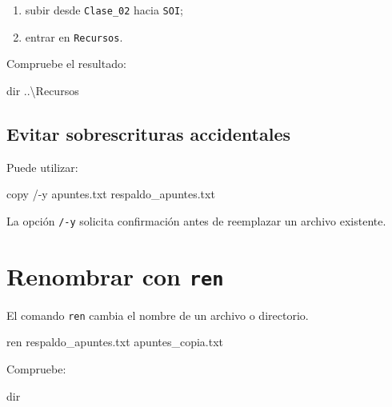 \documentclass[
  spanish,
  letterpaper,
]{scrbook}
\newenvironment{Shaded}{\begin{snugshade}}{\end{snugshade}}
\newcommand{\AttributeTok}[1]{\textcolor[rgb]{0.40,0.45,0.13}{#1}}
\newcommand{\BuiltInTok}[1]{\textcolor[rgb]{0.00,0.23,0.31}{#1}}
\newcommand{\NormalTok}[1]{\textcolor[rgb]{0.00,0.23,0.31}{#1}}
\providecommand{\tightlist}{%
  \setlength{\itemsep}{0pt}\setlength{\parskip}{0pt}}
\begin{document}
\begin{enumerate}
\def\labelenumi{\arabic{enumi}.}
\tightlist
\item
  subir desde \texttt{Clase\_02} hacia \texttt{SOI};
\item
  entrar en \texttt{Recursos}.
\end{enumerate}

Compruebe el resultado:

\begin{Shaded}
\begin{Highlighting}[]
\BuiltInTok{dir}\NormalTok{ ..\textbackslash{}Recursos}
\end{Highlighting}
\end{Shaded}

\section{Evitar sobrescrituras
accidentales}\label{evitar-sobrescrituras-accidentales}

Puede utilizar:

\begin{Shaded}
\begin{Highlighting}[]
\BuiltInTok{copy}\NormalTok{ /}\AttributeTok{{-}y}\NormalTok{ apuntes.txt respaldo\_apuntes.txt}
\end{Highlighting}
\end{Shaded}

La opción \texttt{/-y} solicita confirmación antes de reemplazar un
archivo existente.


\chapter{\texorpdfstring{Renombrar con
\texttt{ren}}{Renombrar con ren}}\label{renombrar-con-ren}

El comando \texttt{ren} cambia el nombre de un archivo o directorio.

\begin{Shaded}
\begin{Highlighting}[]
\BuiltInTok{ren}\NormalTok{ respaldo\_apuntes.txt apuntes\_copia.txt}
\end{Highlighting}
\end{Shaded}

Compruebe:

\begin{Shaded}
\begin{Highlighting}[]
\BuiltInTok{dir}
\end{Highlighting}
\end{Shaded}
\end{document}
